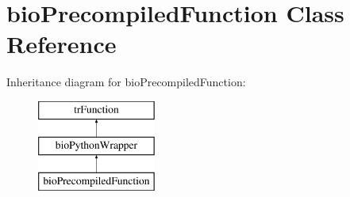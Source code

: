 \hypertarget{classbio_precompiled_function}{}\section{bio\+Precompiled\+Function Class Reference}
\label{classbio_precompiled_function}
Inheritance diagram for bio\+Precompiled\+Function\+:\begin{figure}[H]
\begin{center}
\leavevmode
\includegraphics[height=3.000000cm]{classbio_precompiled_function}
\end{center}
\end{figure}
